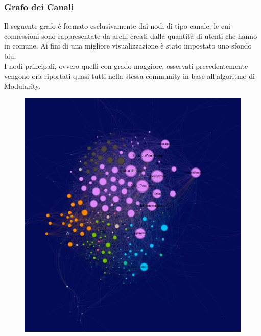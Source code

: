 \documentclass[12pt]{article}
\begin{document}
\subsubsection{Grafo dei Canali}
Il seguente grafo è formato esclusivamente dai nodi di tipo canale, le cui connessioni sono rappresentate da archi creati dalla quantità di utenti che hanno in comune. Ai fini di una migliore visualizzazione è stato impostato uno sfondo blu.\\
I nodi principali, ovvero quelli con grado maggiore, osservati precedentemente vengono ora riportati quasi tutti nella stessa community in base all'algoritmo di Modularity.
\begin{figure}[H]
	\centering
	\includegraphics[width=1.0\textwidth]{immagini/grafo_canali_solo1}
\end{figure}
\newpage
\end{document}
